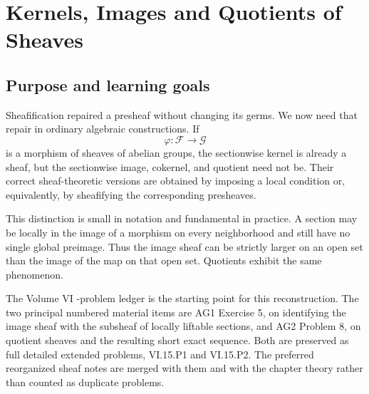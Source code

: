 
\chapter{Kernels, Images and Quotients of Sheaves}
\label{ch:kernels-images-quotients-sheaves}
\providecommand{\id}{\operatorname{id}}
\providecommand{\PreSh}{\mathbf{PreSh}}
\providecommand{\Sh}{\mathbf{Sh}}
\providecommand{\Ker}{\operatorname{Ker}}
\providecommand{\Coim}{\operatorname{Coim}}
\providecommand{\F}{\mathcal F}
\providecommand{\G}{\mathcal G}
\providecommand{\Hcal}{\mathcal H}
\providecommand{\Kcal}{\mathcal K}
\providecommand{\Qcal}{\mathcal Q}

\section*{Purpose and learning goals}

Sheafification repaired a presheaf without changing its germs.  We now need that repair in
ordinary algebraic constructions.  If
\[
\varphi:\F\longrightarrow\G
\]
is a morphism of sheaves of abelian groups, the sectionwise kernel is already a sheaf, but
the sectionwise image, cokernel, and quotient need not be.  Their correct sheaf-theoretic
versions are obtained by imposing a local condition or, equivalently, by sheafifying the
corresponding presheaves.

This distinction is small in notation and fundamental in practice.  A section may be locally
in the image of a morphism on every neighborhood and still have no single global preimage.
Thus the image sheaf can be strictly larger on an open set than the image of the map on that
open set.  Quotients exhibit the same phenomenon.

The Volume VI -problem ledger is the starting point for this reconstruction.  The two
principal numbered material items are AG1 Exercise 5, on identifying the image sheaf with the
subsheaf of locally liftable sections, and AG2 Problem 8, on quotient sheaves and the resulting
short exact sequence.  Both are preserved as full detailed extended problems, VI.15.P1 and VI.15.P2.
The preferred reorganized sheaf notes are merged with them and with the chapter theory rather
than counted as duplicate problems.

